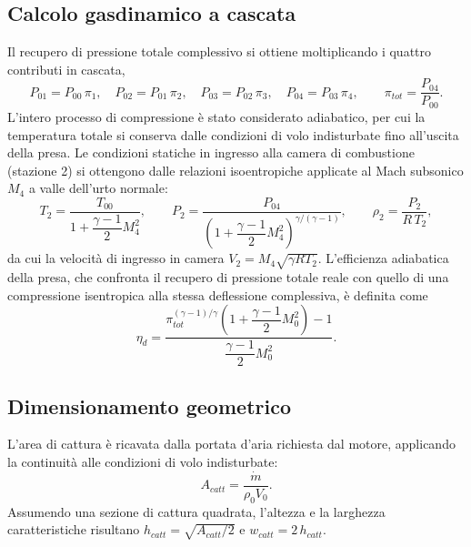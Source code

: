 \subsection{Calcolo gasdinamico a cascata}

Il recupero di pressione totale complessivo si ottiene moltiplicando i quattro contributi in cascata,
\begin{equation*}
    P_{01}=P_{00}\,\pi_1, \quad P_{02}=P_{01}\,\pi_2, \quad P_{03}=P_{02}\,\pi_3, \quad P_{04}=P_{03}\,\pi_4, \qquad \pi_{tot} = \frac{P_{04}}{P_{00}}.
\end{equation*}
L'intero processo di compressione è stato considerato adiabatico, per cui la temperatura totale si conserva dalle condizioni di volo indisturbate fino all'uscita della presa. Le condizioni statiche in ingresso alla camera di combustione (stazione 2) si ottengono dalle relazioni isoentropiche applicate al Mach subsonico $M_4$ a valle dell'urto normale:
\begin{equation*}
    T_2 = \frac{T_{00}}{1+\dfrac{\gamma-1}{2}M_4^2}, \qquad
    P_2 = \frac{P_{04}}{\left(1+\dfrac{\gamma-1}{2}M_4^2\right)^{\gamma/(\gamma-1)}}, \qquad
    \rho_2 = \frac{P_2}{R\,T_2},
\end{equation*}
da cui la velocità di ingresso in camera $V_2 = M_4\sqrt{\gamma R T_2}$. L'efficienza adiabatica della presa, che confronta il recupero di pressione totale reale con quello di una compressione isentropica alla stessa deflessione complessiva, è definita come
\begin{equation*}
    \eta_d = \frac{\pi_{tot}^{(\gamma-1)/\gamma}\left(1+\dfrac{\gamma-1}{2}M_0^2\right) - 1}{\dfrac{\gamma-1}{2}M_0^2}.
\end{equation*}

\subsection{Dimensionamento geometrico}

L'area di cattura è ricavata dalla portata d'aria richiesta dal motore, applicando la continuità alle condizioni di volo indisturbate:
\begin{equation*}
    A_{catt} = \frac{\dot{m}}{\rho_0 V_0}.
\end{equation*}
Assumendo una sezione di cattura quadrata, l'altezza e la larghezza caratteristiche risultano $h_{catt}=\sqrt{A_{catt}/2}$ e $w_{catt}=2\,h_{catt}$.

